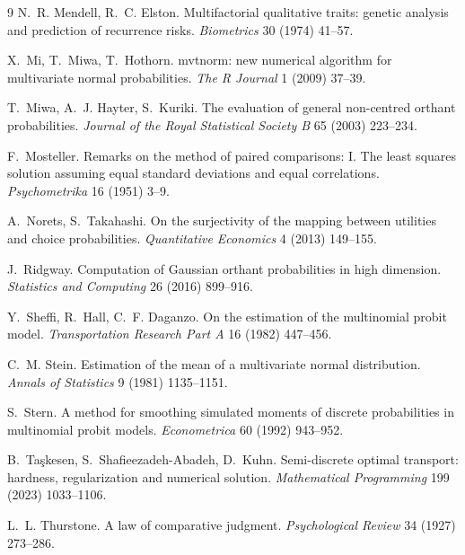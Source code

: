 \documentclass[12pt]{article}
\theoremstyle{remark}
\begin{document}
\begin{thebibliography}{9}
 N.~R. Mendell, R.~C. Elston. Multifactorial
qualitative traits: genetic analysis and prediction of recurrence risks.
\emph{Biometrics} 30 (1974) 41--57.

 X.~Mi, T.~Miwa,
T.~Hothorn. mvtnorm: new numerical algorithm for multivariate normal
probabilities. \emph{The R Journal} 1 (2009) 37--39.

 T.~Miwa,
A.~J. Hayter, S.~Kuriki. The evaluation of general non-centred orthant
probabilities. \emph{Journal of the Royal Statistical Society B} 65
(2003) 223--234.

 F.~Mosteller. Remarks on the
method of paired comparisons: I. The least squares solution assuming
equal standard deviations and equal correlations. \emph{Psychometrika}
16 (1951) 3--9.

 A.~Norets, S.~Takahashi. On the surjectivity of the
mapping between utilities and choice probabilities. \emph{Quantitative
Economics} 4 (2013) 149--155.

 J.~Ridgway. Computation of Gaussian orthant
probabilities in high dimension. \emph{Statistics and Computing} 26 (2016)
899--916.

Y.~Sheffi, R.~Hall, C.~F. Daganzo. On the estimation of the multinomial
probit model. \emph{Transportation Research Part A} 16 (1982) 447--456.

 C.~M. Stein. Estimation of the mean
of a multivariate normal distribution. \emph{Annals of Statistics} 9
(1981) 1135--1151.

 S.~Stern. A method for smoothing
simulated moments of discrete probabilities in multinomial probit
models. \emph{Econometrica} 60 (1992) 943--952.

 B.~Ta\c{s}kesen, S.~Shafieezadeh-Abadeh,
D.~Kuhn. Semi-discrete optimal transport: hardness, regularization and
numerical solution. \emph{Mathematical Programming} 199 (2023)
1033--1106.

 L.~L. Thurstone. A law of comparative judgment.
\emph{Psychological Review} 34 (1927) 273--286.


\end{thebibliography}
\end{document}
